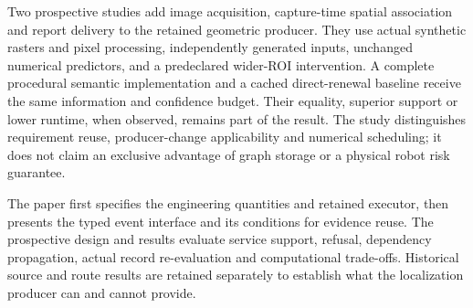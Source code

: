 Two prospective studies add image acquisition, capture-time spatial association and report delivery to the retained geometric producer. They use actual synthetic rasters and pixel processing, independently generated inputs, unchanged numerical predictors, and a predeclared wider-ROI intervention. A complete procedural semantic implementation and a cached direct-renewal baseline receive the same information and confidence budget. Their equality, superior support or lower runtime, when observed, remains part of the result. The study distinguishes requirement reuse, producer-change applicability and numerical scheduling; it does not claim an exclusive advantage of graph storage or a physical robot risk guarantee.

The paper first specifies the engineering quantities and retained executor, then presents the typed event interface and its conditions for evidence reuse. The prospective design and results evaluate service support, refusal, dependency propagation, actual record re-evaluation and computational trade-offs. Historical source and route results are retained separately to establish what the localization producer can and cannot provide.
